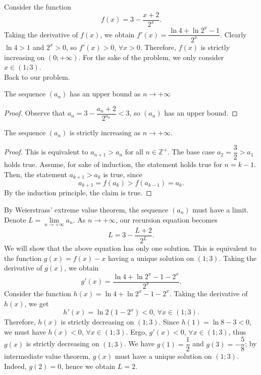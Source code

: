 \documentclass[11pt]{article}
\begin{document}
        \begin{solution}
            Consider the function
            \[f(x) = 3 - \frac{x + 2}{2^x}.\]
            Taking the derivative of \(f(x)\), we obtain \(f'(x) = \dfrac{\ln 4 + \ln 2^x - 1}{2^x}\). Clearly \(\ln 4 > 1\) and \(2^x > 0\), so \(f'(x) > 0\), \(\forall x > 0\). Therefore, \(f(x)\) is strictly increasing on \((0;+\infty)\). For the sake of the problem, we only consider \(x \in (1;3)\).\\
            Back to our problem.
            
            \begin{claim}
                The sequence \((a_n)\) has an upper bound as \(n \to +\infty\)
            \end{claim}
            
            \begin{proof}
                Observe that \(a_n = 3 - \dfrac{a_n + 2}{2^{a_n}} < 3\), so \((a_n)\) has an upper bound.
            \end{proof}

            \begin{claim}
                The sequence \((a_n)\) is strictly increasing as \(n \to +\infty\).
            \end{claim}

            \begin{proof}
                This is equivalent to \(a_{n+1} > a_n\) for all \(n \in \mathbb{Z}^+\). The base case \(a_2 = \dfrac{3}{2} > a_1\) holds true. Assume, for sake of induction, the statement holds true for \(n = k - 1\). Then, the statement \(a_{k+1} > a_k\) is true, since
                \[a_{k+1} = f(a_k) > f(a_{k-1}) = a_k.\]
                By the induction principle, the claim is true.
            \end{proof}

            By Weierstrass' extreme value theorem, the sequence \((a_n)\) must have a limit. Denote \(L = \lim\limits_{n \to +\infty} a_n\). As \(n \to +\infty\), our recursion equation becomes
            \[L = 3 - \frac{L + 2}{2^L}.\]
            We will show that the above equation has only one solution. This is equivalent to the function \(g(x) = f(x) - x\) having a unique solution on \((1;3)\). Taking the derivative of \(g(x)\), we obtain
            \[g'(x) = \frac{\ln 4 + \ln 2^x - 1 - 2^x}{2^x}.\]
            Consider the function \(h(x) = \ln 4 + \ln 2^x - 1 - 2^x\). Taking the derivative of \(h(x)\), we get
            \[h'(x) = \ln 2 (1 - 2^x) < 0 \text{, } \forall x \in (1;3).\]
            Therefore, \(h(x)\) is strictly decreasing on \((1;3)\). Since \(h(1) = \ln 8 - 3 < 0\), we must have \(h(x) < 0\), \(\forall x \in (1;3)\). Ergo, \(g'(x) < 0\), \(\forall x \in (1;3)\), thus \(g(x)\) is strictly decreasing on \((1;3)\). We have \(g(1) = \dfrac{1}{2}\) and \(g(3) = -\dfrac{5}{8}\); by intermediate value theorem, \(g(x)\) must have a unique solution on \((1;3)\). Indeed, \(g(2) = 0\), hence we obtain \(L = 2\).
        \end{solution}
\end{document}
